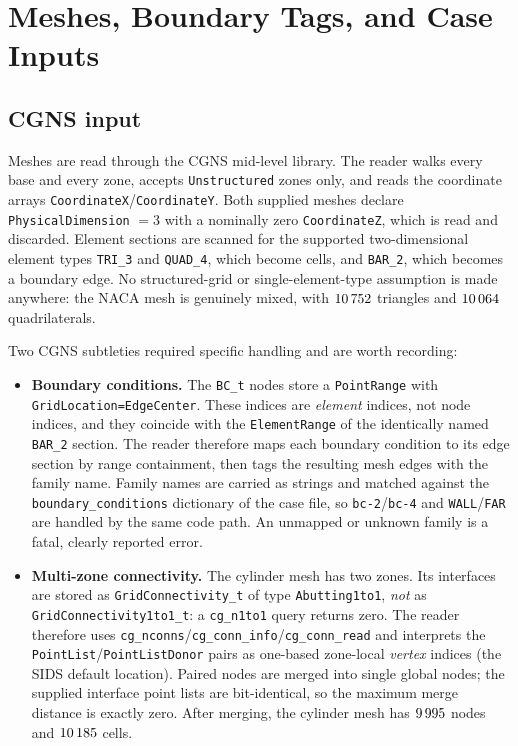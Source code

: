\section{Meshes, Boundary Tags, and Case Inputs}
\label{sec:mesh}

\subsection{CGNS input}

Meshes are read through the CGNS mid-level library. The reader walks every base
and every zone, accepts \texttt{Unstructured} zones only, and reads the
coordinate arrays \texttt{CoordinateX}/\texttt{CoordinateY}. Both supplied
meshes declare \texttt{PhysicalDimension} $=3$ with a nominally zero
\texttt{CoordinateZ}, which is read and discarded. Element sections are scanned
for the supported two-dimensional element types \texttt{TRI\_3} and
\texttt{QUAD\_4}, which become cells, and \texttt{BAR\_2}, which becomes a
boundary edge. No structured-grid or single-element-type assumption is made
anywhere: the NACA mesh is genuinely mixed, with $10\,752$ triangles and
$10\,064$ quadrilaterals.

Two CGNS subtleties required specific handling and are worth recording:

\begin{itemize}
  \item \textbf{Boundary conditions.} The \texttt{BC\_t} nodes store a
  \texttt{PointRange} with \texttt{GridLocation=EdgeCenter}. These indices are
  \emph{element} indices, not node indices, and they coincide with the
  \texttt{ElementRange} of the identically named \texttt{BAR\_2} section. The
  reader therefore maps each boundary condition to its edge section by range
  containment, then tags the resulting mesh edges with the family name. Family
  names are carried as strings and matched against the
  \texttt{boundary\_conditions} dictionary of the case file, so
  \texttt{bc-2}/\texttt{bc-4} and \texttt{WALL}/\texttt{FAR} are handled by the
  same code path. An unmapped or unknown family is a fatal, clearly reported
  error.
  \item \textbf{Multi-zone connectivity.} The cylinder mesh has two zones. Its
  interfaces are stored as \texttt{GridConnectivity\_t} of type
  \texttt{Abutting1to1}, \emph{not} as \texttt{GridConnectivity1to1\_t}: a
  \texttt{cg\_n1to1} query returns zero. The reader therefore uses
  \texttt{cg\_nconns}/\texttt{cg\_conn\_info}/\texttt{cg\_conn\_read} and
  interprets the \texttt{PointList}/\texttt{PointListDonor} pairs as one-based
  zone-local \emph{vertex} indices (the SIDS default location). Paired nodes are
  merged into single global nodes; the supplied interface point lists are
  bit-identical, so the maximum merge distance is exactly zero. After merging,
  the cylinder mesh has $9\,995$ nodes and $10\,185$ cells.
\end{itemize}

